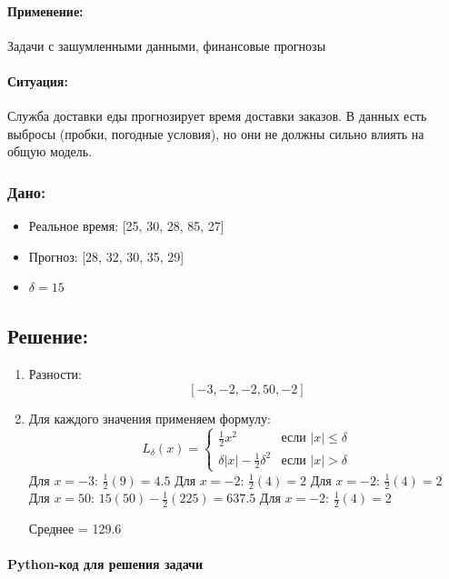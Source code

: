 \paragraph{Применение:} Задачи с зашумленными данными, финансовые прогнозы

\paragraph{Ситуация:} Служба доставки еды прогнозирует время доставки заказов. В данных есть выбросы (пробки, погодные условия), но они не должны сильно влиять на общую модель.

\subsubsection*{Дано:}
\begin{itemize}
    \item Реальное время: [25, 30, 28, 85, 27]
    \item Прогноз: [28, 32, 30, 35, 29]
    \item $\delta = 15$
\end{itemize}

\subsection*{Решение:}

\begin{enumerate}
    \item {Разности:}
    \[
    [-3, -2, -2, 50, -2]
    \]
    
    \item{Для каждого значения применяем формулу:}
    \[
    L_\delta(x) = \begin{cases}
    \frac{1}{2}x^2 & \text{если } |x| \leq \delta \\
    \delta|x| - \frac{1}{2}\delta^2 & \text{если } |x| > \delta
    \end{cases}
    \]
    Для $x = -3$: $\frac{1}{2}(9) = 4.5$
    Для $x = -2$: $\frac{1}{2}(4) = 2$
    Для $x = -2$: $\frac{1}{2}(4) = 2$
    Для $x = 50$: $15(50) - \frac{1}{2}(225) = 637.5$
    Для $x = -2$: $\frac{1}{2}(4) = 2$
    
    Среднее = 129.6
\end{enumerate}

\paragraph*{Python-код для решения задачи}

